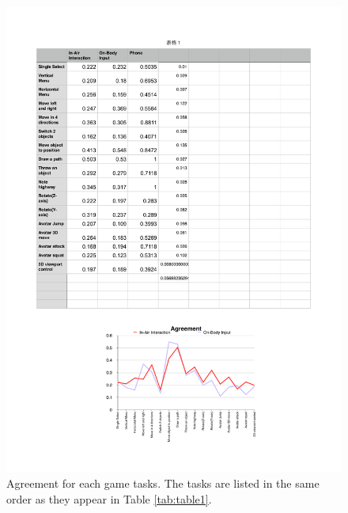 \documentclass{sigchi}
\begin{document}
 \begin{figure}[!h]
  \centering
  \includegraphics[width=1\columnwidth]{Agreement.pdf}

  \caption{Agreement for each game tasks. The tasks are listed in the same order as they appear in Table \ref{tab:table1}.}
  \label{fig:Agreement}
  \end{figure} 


\end{document}
